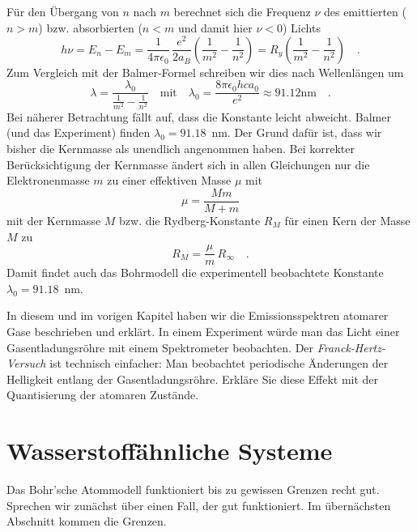 Für den Übergang von $n$ nach $m$ berechnet sich die Frequenz $\nu$ des emittierten ($n > m$) bzw. absorbierten ($n < m$ und damit hier $\nu < 0$) Lichts
\begin{equation}
    h \nu = E_n - E_m  =   \frac{1}{4 \pi \epsilon_0}  \, \frac{e^2}{2 a_B}  \left( \frac{1}{m^2} - \frac{1}{n^2} \right) 
    = R_y  \left( \frac{1}{m^2} - \frac{1}{n^2} \right)  \quad .
\end{equation}
Zum Vergleich mit der Balmer-Formel schreiben wir dies nach Wellenlängen um
\begin{equation}
    \lambda = \frac{\lambda_0}{\frac{1}{m^2} - \frac{1}{n^2}} \quad \text{mit} \quad \lambda_0 = \frac{8 \pi \epsilon_0 h c a_0}{e^2} \approx 91.12 \text{nm} \quad .
\end{equation}
Bei näherer Betrachtung fällt auf, dass die Konstante leicht abweicht. Balmer (und das Experiment) finden $\lambda_0 = 91.18$~nm. Der Grund dafür ist, dass wir bisher die Kernmasse als unendlich angenommen haben. Bei korrekter Berücksichtigung der Kernmasse ändert sich in allen Gleichungen nur die Elektronenmasse $m$ zu einer effektiven Masse $\mu$ mit
\begin{equation}
    \mu = \frac{M m }{M + m}  
\end{equation} 
mit der Kernmasse $M$ bzw. die Rydberg-Konstante $R_M$ für einen Kern der Masse $M$ zu
\begin{equation}
    R_M = \frac{\mu}{m} \, R_\infty \quad .
\end{equation}
Damit findet auch das Bohrmodell die experimentell beobachtete Konstante $\lambda_0 = 91.18$~nm.




\begin{questions}
 \item In diesem und im vorigen Kapitel haben wir die Emissionsspektren atomarer Gase beschrieben und erklärt. In einem Experiment würde man das Licht einer Gasentladungsröhre mit einem Spektrometer beobachten. 
 Der \emph{Franck-Hertz-Versuch} ist technisch einfacher: Man beobachtet periodische Änderungen der Helligkeit entlang der Gasentladungsröhre. Erkläre Sie diese Effekt mit der Quantisierung der atomaren Zustände.
\end{questions}

\section{Wasserstoffähnliche Systeme}

Das Bohr'sche Atommodell funktioniert bis zu gewissen Grenzen recht gut. Sprechen wir zunächst über einen Fall, der gut funktioniert. Im übernächsten Abschnitt kommen die Grenzen.

